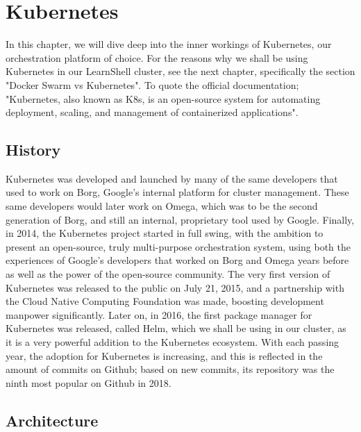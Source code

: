 \documentclass[thesis=B,english]{FITthesis}[2019/12/23]
\begin{document}
\section{Kubernetes}

In this chapter, we will dive deep into the inner workings of Kubernetes, our orchestration platform of choice. For the reasons why we shall be using Kubernetes in our LearnShell cluster, see the next chapter, specifically the section "Docker Swarm vs Kubernetes".
\newline
To quote the official documentation; "Kubernetes, also known as K8s, is an open-source system for automating deployment, scaling, and management of containerized applications". \cite{kube-documentation}

\subsection{History}

Kubernetes was developed and launched by many of the same developers that used to work on Borg, Google's internal platform for cluster management. \cite{unix-handbook} These same developers would later work on Omega, which was to be the second generation of Borg, and still an internal, proprietary tool used by Google. Finally, in 2014, the Kubernetes project started in full swing, with the ambition to present an open-source, truly multi-purpose orchestration system, using both the experiences of Google's developers that worked on Borg and Omega years before as well as the power of the open-source community. \cite{medium-kube-history}
\newline
The very first version of Kubernetes was released to the public on July 21, 2015, and a partnership with the Cloud Native Computing Foundation was made, boosting development manpower significantly. Later on, in 2016, the first package manager for Kubernetes was released, called Helm, which we shall be using in our cluster, as it is a very powerful addition to the Kubernetes ecosystem. With each passing year, the adoption for Kubernetes is increasing, and this is reflected in the amount of commits on Github; based on new commits, its repository was the ninth most popular on Github in 2018. \cite{cncf-kube-graduate}

\subsection{Architecture}
\end{document}
